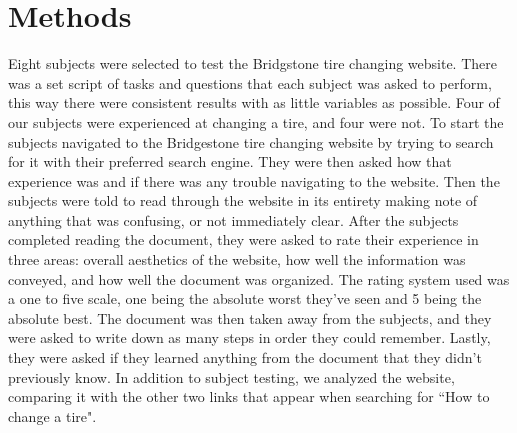 \documentclass[12pt,A4paper]{article}
\begin{document}
	\section{Methods}
	Eight subjects were selected to test the Bridgstone tire changing website. There was a set script of tasks and questions that each subject was asked to perform, this way there were consistent results with as little variables as possible. Four of our subjects were experienced at changing a tire, and four were not. To start the subjects navigated to the Bridgestone tire changing website by trying to search for it with their preferred search engine. They were then asked how that experience was and if there was any trouble navigating to the website. Then the subjects were told to read through the website in its entirety making note of anything that was confusing, or not immediately clear. After the subjects completed reading the document, they were asked to rate their experience in three areas: overall aesthetics of the website, how well the information was conveyed, and how well the document was organized. The rating system used was a one to five scale, one being the absolute worst they’ve seen and 5 being the absolute best. The document was then taken away from the subjects, and they were asked to write down as many steps in order they could remember. Lastly, they were asked if they learned anything from the document that they didn’t previously know. In addition to subject testing, we analyzed the website, comparing it with the other two links that appear when searching for “How to change a tire". 
\end{document}
